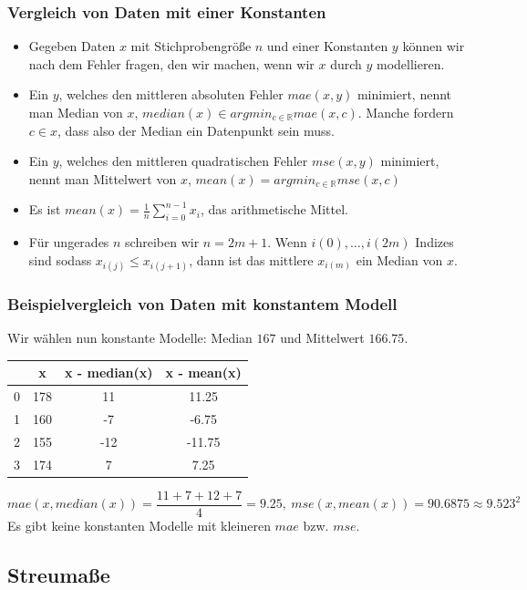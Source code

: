     \begin{frame}
    \frametitle{Vergleich von Daten mit einer Konstanten}
\begin{itemize}[<+->]
\item    Gegeben Daten $x$ mit Stichprobengröße $n$ und einer Konstanten $y$ können wir nach dem Fehler fragen, den wir machen, wenn wir $x$ durch $y$ modellieren.
\item  Ein $y$, welches den mittleren absoluten Fehler $mae(x,y)$ minimiert, nennt man \alert{Median} von $x$,
  $median(x) \in argmin_{c \in \mathbb{R}} mae(x,c)$. Manche fordern $c \in x$, dass also der Median ein Datenpunkt sein muss.
\item Ein $y$, welches den mittleren quadratischen Fehler $mse(x,y)$ minimiert, nennt man \alert{Mittelwert} von $x$, $mean(x) = argmin_{c \in \mathbb{R}} mse(x,c)$
\item Es ist $mean(x) = \frac{1}{n} \sum_{i=0}^{n-1} x_i$, das arithmetische Mittel.
  \item Für ungerades $n$ schreiben wir $n=2m+1$. Wenn $i(0),\dots,i(2m)$ Indizes sind sodass $x_{i(j)} \leq x_{i(j+1)}$, dann ist das mittlere $x_{i(m)}$ ein Median von $x$.
\end{itemize}
\end{frame}

  \begin{frame}
    \frametitle{Beispielvergleich von Daten mit konstantem Modell}
    Wir wählen nun konstante Modelle:
    Median $167$ und Mittelwert $166.75$.
    
    \begin{tabular}{|c|c|c|c|}
     \hline
       & x & x - median(x) & x - mean(x)\\ \hline
     0 & 178 & 11 & 11.25 \\
     1 & 160 & -7 & -6.75\\
     2 & 155 & -12 & -11.75\\
     3 & 174 & 7 & 7.25\\ \hline
    \end{tabular}
    \[mae(x,median(x)) = \dfrac{11+7+12+7}{4} = 9.25,\ mse(x,mean(x)) = 90.6875 \approx 9.523^2\]
    Es gibt keine konstanten Modelle mit kleineren $mae$ bzw. $mse$.
  \end{frame}

\subsection{Streumaße}
  
